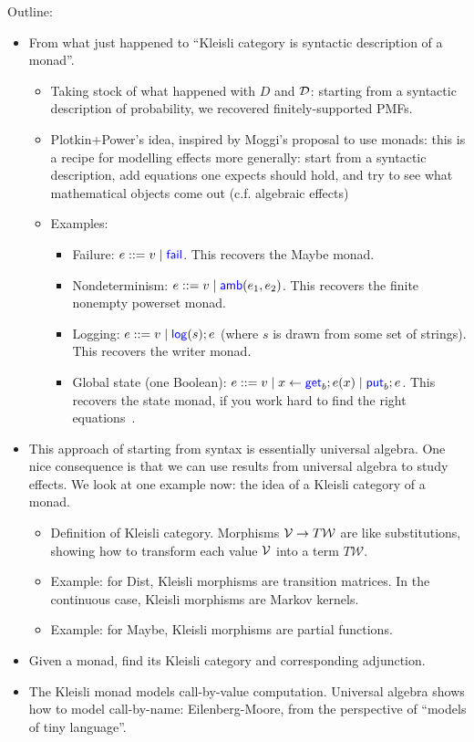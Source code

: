 Outline:
\begin{itemize}
    \item From what just happened to ``Kleisli category is syntactic description of a monad''. \begin{itemize}
      \item Taking stock of what happened with \(D\) and \(\mathcal D\): starting from a syntactic
        description of probability, we recovered finitely-supported PMFs.
      \item Plotkin+Power's idea, inspired by Moggi's proposal to use monads:
        this is a recipe for modelling effects more generally:
        start from a syntactic description, add equations one expects should hold,
        and try to see what mathematical objects come out (c.f. algebraic effects)
      \item Examples: \begin{itemize}
        \item Failure: \(e ::= v \mid \mathsf{{\color{blue}fail}}\). This recovers the Maybe monad.
        \item Nondeterminism: \(e ::= v \mid \mathsf{{\color{blue}amb}}(e_1,e_2)\). This recovers the finite nonempty powerset monad.
        \item Logging: \(e ::= v \mid \mathsf{{\color{blue}log}}(s); e\) (where \(s\) is drawn from some set of strings).
          This recovers the writer monad.
        \item Global state (one Boolean): \(e ::= v \mid x \gets \mathsf{{\color{blue}get}}_b; e(x) \mid \mathsf{{\color{blue}put}}_b; e\).
          This recovers the state monad, if you work hard to find the right equations~\cite{plotkin2002notions}.
        \end{itemize}
      \end{itemize}
    \item This approach of starting from syntax is essentially universal algebra.
      One nice consequence is that we can use results from universal algebra to study effects.
      We look at one example now: the idea of a Kleisli category of a monad. \begin{itemize}
      \item Definition of Kleisli category. Morphisms \(\mathcal V \to T{\mathcal W}\) are like substitutions,
        showing how to transform each value \(\mathcal V\) into a term \(T{\mathcal W}\).
      \item Example: for Dist, Kleisli morphisms are transition matrices.
        In the continuous case, Kleisli morphisms are Markov kernels.
      \item Example: for Maybe, Kleisli morphisms are partial functions.
      \end{itemize}
    \item Given a monad, find its Kleisli category and corresponding adjunction.
    \item The Kleisli monad models call-by-value computation.
      Universal algebra shows how to model call-by-name:
      Eilenberg-Moore, from the perspective of ``models of tiny language''.
\end{itemize}

